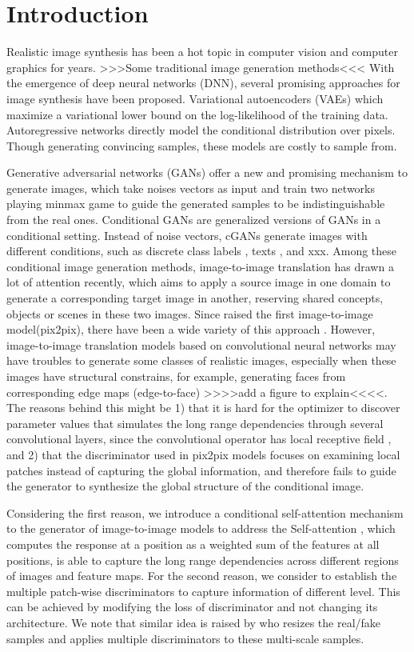 \section{Introduction}
Realistic image synthesis has been a hot topic in computer vision and computer graphics for years. >>>Some traditional image generation methods<<< With the emergence of deep neural networks (DNN), several promising approaches for image synthesis have been proposed. Variational autoencoders (VAEs) \cite{VAEs} which maximize a variational lower bound on the log-likelihood of the training data. Autoregressive \cite{PixCNN} networks directly model the conditional distribution over pixels. Though generating convincing samples, these models are costly to sample from.

Generative adversarial networks (GANs) \cite{GANs} offer a new and promising mechanism to generate images, which take noises vectors as input and train two networks playing minmax game to guide the generated samples to be indistinguishable from the real ones. 
Conditional GANs are generalized versions of GANs in a conditional setting. Instead of noise vectors, cGANs generate images with different conditions, such as discrete class labels \cite{cGANs}, texts \cite{StackGANs}, and xxx. Among these conditional image generation methods, image-to-image translation has drawn a lot of attention recently, which aims to apply a source image in one domain to generate a corresponding target image in another, reserving shared concepts, objects or scenes in these two images. Since \cite{pix2pix}  raised the first image-to-image model(pix2pix), there have been a wide variety of this approach \cite{xxxxxxxx}. However, image-to-image translation models based on convolutional neural networks may have troubles to generate some classes of realistic images, especially when these images have structural constrains, for example, generating faces from corresponding edge maps (edge-to-face) >>>>add a figure to explain<<<<. The reasons behind this might be 1) that it is hard for the optimizer to discover parameter values that simulates the long range dependencies through several convolutional layers, since the convolutional operator has local receptive field \cite{SAGANs}, and 2) that the discriminator used in pix2pix models \cite{PatchGANs} focuses on examining local patches instead of capturing the global information, and therefore fails to guide the generator to synthesize the global structure of the conditional image. 

Considering the first reason, we introduce a conditional self-attention mechanism to the generator of image-to-image models to address the 
Self-attention \cite{Non-local, Attention, MachineReading, SAGAN}, which computes the response at a position as a weighted sum of the features at all positions, is able to capture the long range dependencies across different regions of images and feature maps.
%
For the second reason, we consider to establish the multiple patch-wise discriminators to capture information of different level. This can be achieved by modifying the loss of discriminator and not changing its architecture. We note that similar idea is raised by \cite{Multi-D} who resizes the real/fake samples and applies multiple discriminators to these multi-scale samples. 

